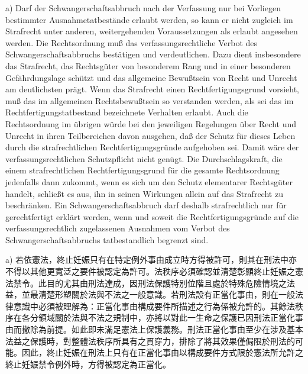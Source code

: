 \documentclass[12pt]{article}
\begin{document}
\begin{sourcepara}[title={原文D.90}]
a) Darf der Schwangerschaftsabbruch nach der Verfassung nur bei Vorliegen bestimmter Ausnahmetatbestände erlaubt werden, so kann er nicht zugleich im Strafrecht unter anderen, weitergehenden Voraussetzungen als erlaubt angesehen werden. Die Rechtsordnung muß das verfassungsrechtliche Verbot des Schwangerschaftsabbruchs bestätigen und verdeutlichen. Dazu dient insbesondere das Strafrecht, das Rechtsgüter von besonderem Rang und in einer besonderen Gefährdungslage schützt und das allgemeine Bewußtsein von Recht und Unrecht am deutlichsten prägt. Wenn das Strafrecht einen Rechtfertigungsgrund vorsieht, muß das im allgemeinen Rechtsbewußtsein so verstanden werden, als sei das im Rechtfertigungstatbestand bezeichnete Verhalten erlaubt. Auch die Rechtsordnung im übrigen würde bei den jeweiligen Regelungen über Recht und Unrecht in ihren Teilbereichen davon ausgehen, daß der Schutz für dieses Leben durch die strafrechtlichen Rechtfertigungsgründe aufgehoben sei. Damit wäre der verfassungsrechtlichen Schutzpflicht nicht genügt. Die Durchschlagskraft, die einem strafrechtlichen Rechtfertigungsgrund für die gesamte Rechtsordnung jedenfalls dann zukommt, wenn es sich um den Schutz elementarer Rechtsgüter handelt, schließt es aus, ihn in seinen Wirkungen allein auf das Strafrecht zu beschränken. Ein Schwangerschaftsabbruch darf deshalb strafrechtlich nur für gerechtfertigt erklärt werden, wenn und soweit die Rechtfertigungsgründe auf die verfassungsrechtlich zugelassenen Ausnahmen vom Verbot des Schwangerschaftsabbruchs tatbestandlich begrenzt sind.
\end{sourcepara}
\begin{transpara}
a) 若依憲法，終止妊娠只有在特定例外事由成立時方得被許可，則其在刑法中亦不得以其他更寬泛之要件被認定為許可。法秩序必須確認並清楚彰顯終止妊娠之憲法禁令。此目的尤其由刑法達成，因刑法保護特別位階且處於特殊危險情境之法益，並最清楚形塑關於法與不法之一般意識。若刑法設有正當化事由，則在一般法律意識中必須被理解為：正當化事由構成要件所描述之行為係被允許的。其餘法秩序在各分領域關於法與不法之規制中，亦將以對此一生命之保護已因刑法正當化事由而撤除為前提。如此即未滿足憲法上保護義務。刑法正當化事由至少在涉及基本法益之保護時，對整體法秩序所具有之貫穿力，排除了將其效果僅侷限於刑法的可能。因此，終止妊娠在刑法上只有在正當化事由以構成要件方式限於憲法所允許之終止妊娠禁令例外時，方得被認定為正當化。
\end{transpara}
\end{document}
